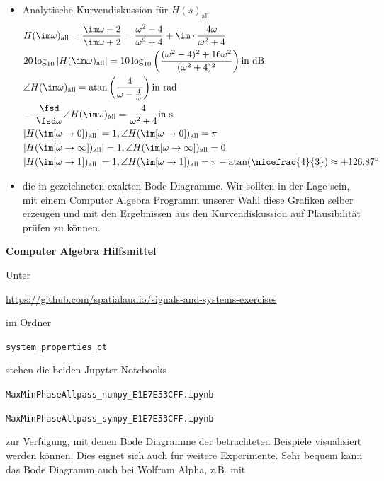 \begin{itemize}
\item Analytische Kurvendiskussion für $H(s)_\mathrm{all}$
\begin{align}
&H(\im\omega)_\mathrm{all} = \frac{\im\omega-2}{\im\omega+2}=
\frac{\omega^2-4}{\omega^2+4}+
\im\cdot\frac{4\omega}{\omega^2+4}\\
&20 \log_{10}|H(\im\omega)_\mathrm{all}| =
10 \log_{10} \left(\frac{(\omega^2-4)^2+16\omega^2}{(\omega^2+4)^2}\right)\text{in dB}\\
&\angle H(\im\omega)_\mathrm{all} =
\mathrm{atan}\left(\frac{4}{\omega-\frac{4}{\omega}}\right)\text{in rad}\\
&-\frac{\fsd}{\fsd \omega} \angle H(\im\omega)_\mathrm{all}=
\frac{4}{\omega^2+4}\text{in s}\\
&|H(\im[\omega\to 0])_\mathrm{all}| = 1, \angle H(\im[\omega\to 0])_\mathrm{all} = \pi\\
&|H(\im[\omega\to\infty])_\mathrm{all}| = 1, \angle H(\im[\omega\to\infty])_\mathrm{all} = 0\\
&|H(\im[\omega\to 1])_\mathrm{all}| = 1, \angle H(\im[\omega\to 1])_\mathrm{all} = \pi - \mathrm{atan}(\nicefrac{4}{3}) \approx +126.87^\circ
\end{align}

\item die in  gezeichneten exakten
Bode Diagramme. Wir sollten in der Lage sein, mit einem Computer Algebra Programm
unserer Wahl diese Grafiken selber erzeugen und mit den Ergebnissen
aus den Kurvendiskussion auf Plausibilität prüfen zu können.

\end{itemize}

\noindent \textbf{Computer Algebra Hilfsmittel}

\noindent Unter

\url{https://github.com/spatialaudio/signals-and-systems-exercises}

\noindent im Ordner

\texttt{system\_properties\_ct}

\noindent stehen die beiden Jupyter Notebooks

\texttt{MaxMinPhaseAllpass\_numpy\_E1E7E53CFF.ipynb}

\texttt{MaxMinPhaseAllpass\_sympy\_E1E7E53CFF.ipynb}

\noindent zur Verfügung, mit denen Bode Diagramme der betrachteten Beispiele visualisiert
werden können. Dies eignet sich auch für weitere Experimente.
Sehr bequem kann das Bode Diagramm auch bei Wolfram Alpha, z.B. mit

